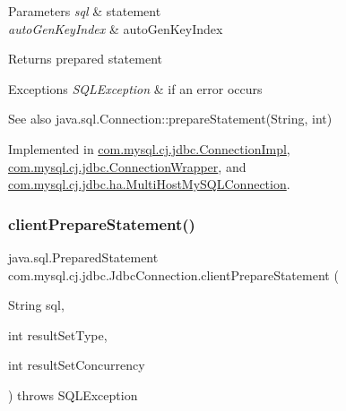 \begin{DoxyParams}{Parameters}
{\em sql} & statement \\
\hline
{\em auto\+Gen\+Key\+Index} & auto\+Gen\+Key\+Index \\
\hline
\end{DoxyParams}
\begin{DoxyReturn}{Returns}
prepared statement 
\end{DoxyReturn}

\begin{DoxyExceptions}{Exceptions}
{\em S\+Q\+L\+Exception} & if an error occurs \\
\hline
\end{DoxyExceptions}
\begin{DoxySeeAlso}{See also}
java.\+sql.\+Connection\+::prepare\+Statement(\+String, int) 
\end{DoxySeeAlso}


Implemented in \mbox{\hyperlink{classcom_1_1mysql_1_1cj_1_1jdbc_1_1_connection_impl_ac15baa66a2fe559cb558a0afd9c7cc03}{com.\+mysql.\+cj.\+jdbc.\+Connection\+Impl}}, \mbox{\hyperlink{classcom_1_1mysql_1_1cj_1_1jdbc_1_1_connection_wrapper_a1dc0327172d67ed88fce75b54c5a87d8}{com.\+mysql.\+cj.\+jdbc.\+Connection\+Wrapper}}, and \mbox{\hyperlink{classcom_1_1mysql_1_1cj_1_1jdbc_1_1ha_1_1_multi_host_my_s_q_l_connection_a384dc86ad7784b2b6f87d74e9242e248}{com.\+mysql.\+cj.\+jdbc.\+ha.\+Multi\+Host\+My\+S\+Q\+L\+Connection}}.

\mbox{\label{interfacecom_1_1mysql_1_1cj_1_1jdbc_1_1_jdbc_connection_a55c0d38bcf8ca54ed272a0a1bbbf7e4c}} 
\subsubsection{\texorpdfstring{client\+Prepare\+Statement()}{clientPrepareStatement()}\hspace{0.1cm}{\footnotesize\ttfamily [3/6]}}
{\footnotesize\ttfamily java.\+sql.\+Prepared\+Statement com.\+mysql.\+cj.\+jdbc.\+Jdbc\+Connection.\+client\+Prepare\+Statement (\begin{DoxyParamCaption}\item[{String}]{sql,  }\item[{int}]{result\+Set\+Type,  }\item[{int}]{result\+Set\+Concurrency }\end{DoxyParamCaption}) throws S\+Q\+L\+Exception}


